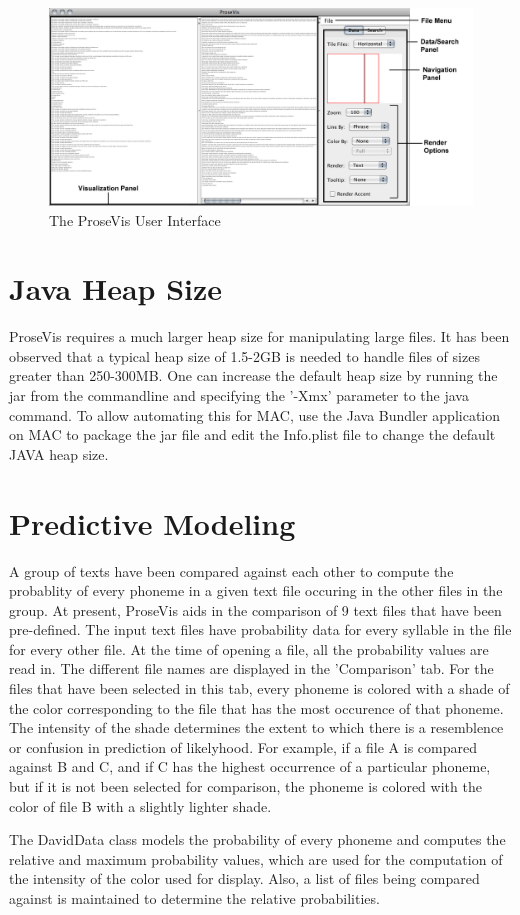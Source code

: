 \documentclass[fleqn]{article}
\begin{document}
\begin{figure}
  \begin{center}  
\includegraphics[scale=.5] {ProseVisImg.png}
\end{center}
\caption{The ProseVis User Interface }
 \end{figure}

\section{Java Heap Size}
ProseVis requires a much larger heap size for manipulating large files. It has been observed that a typical heap size of 1.5-2GB is needed to handle files of sizes greater than 250-300MB. One can increase the default heap size by running the jar from the commandline and specifying the '-Xmx' parameter to the java command. To allow automating this for MAC, use the Java Bundler application on MAC to package the jar file and edit the Info.plist file to change the default JAVA heap size.

\section{Predictive Modeling}
A group of texts have been compared against each other to compute the probablity of every phoneme in a given text file occuring in the other files in the group. At present, ProseVis aids in the comparison of 9 text files that have been pre-defined. The input text files have probability data for every syllable in the file for every other file. At the time of opening a file, all the probability values are read in. The different file names are displayed in the 'Comparison' tab. For the files that have been selected in this tab, every phoneme is colored with a shade of the color corresponding to the file that has the most occurence of that phoneme. The intensity of the shade determines the extent to which there is a resemblence or confusion in prediction of likelyhood. For example, if a file A is compared against B and C, and if C has the highest occurrence of a particular phoneme, but if it is not been selected for comparison, the phoneme is colored with the color of file B with a slightly lighter shade.

The DavidData class models the probability of every phoneme and computes the relative and maximum probability values, which are used for the computation of the intensity of the color used for display. Also, a list of files being compared against is maintained to determine the relative probabilities.
\end{document}
